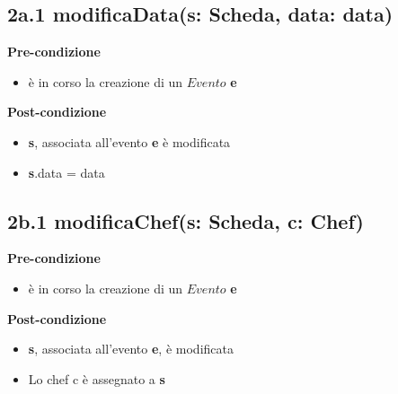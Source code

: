 \documentclass[12pt]{extarticle}
\begin{document}
\subsection*{2a.1 modificaData(s: Scheda, data: data)}

\textbf{Pre-condizione}
\begin{itemize}
  \item è in corso la creazione di un $Evento$ \textbf{e}
\end{itemize} 
\textbf{Post-condizione}
\begin{itemize}
  \item \textbf{s}, associata all'evento \textbf{e} è modificata
  \item \textbf{s}.data = data
\end{itemize} 



\subsection*{2b.1 modificaChef(s: Scheda, c: Chef)}

\textbf{Pre-condizione}
\begin{itemize}
  \item è in corso la creazione di un $Evento$ \textbf{e}
\end{itemize} 
\textbf{Post-condizione}
\begin{itemize}
  \item \textbf{s}, associata all'evento \textbf{e}, è modificata
  \item Lo chef c è assegnato a \textbf{s}
\end{itemize} 
\end{document}
